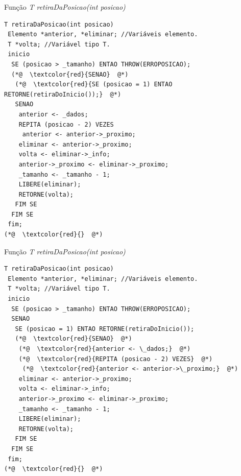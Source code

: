 \documentclass[12pt,table,xcolor={dvipsnames}]{beamer}
\begin{document}
\begin{frame}[fragile]{Função \textit{T retiraDaPosicao(int posicao)}}
\begin{lstlisting}
T retiraDaPosicao(int posicao)
 Elemento *anterior, *eliminar; //Variáveis elemento.
 T *volta; //Variável tipo T.
 inicio
  SE (posicao > _tamanho) ENTAO THROW(ERROPOSICAO);
  (*@  \textcolor{red}{SENAO}  @*)
   (*@  \textcolor{red}{SE (posicao = 1) ENTAO RETORNE(retiraDoInicio());}  @*)
   SENAO
    anterior <- _dados;
    REPITA (posicao - 2) VEZES
     anterior <- anterior->_proximo;
    eliminar <- anterior->_proximo;
    volta <- eliminar->_info;
    anterior->_proximo <- eliminar->_proximo;
    _tamanho <- _tamanho - 1;
    LIBERE(eliminar);
    RETORNE(volta);
   FIM SE
  FIM SE
 fim;
(*@  \textcolor{red}{}  @*)
\end{lstlisting}
\end{frame}

\begin{frame}[fragile]{Função \textit{T retiraDaPosicao(int posicao)}}
\begin{lstlisting}
T retiraDaPosicao(int posicao)
 Elemento *anterior, *eliminar; //Variáveis elemento.
 T *volta; //Variável tipo T.
 inicio
  SE (posicao > _tamanho) ENTAO THROW(ERROPOSICAO);
  SENAO
   SE (posicao = 1) ENTAO RETORNE(retiraDoInicio());
   (*@  \textcolor{red}{SENAO}  @*)
    (*@  \textcolor{red}{anterior <- \_dados;}  @*)
    (*@  \textcolor{red}{REPITA (posicao - 2) VEZES}  @*)
     (*@  \textcolor{red}{anterior <- anterior->\_proximo;}  @*)
    eliminar <- anterior->_proximo;
    volta <- eliminar->_info;
    anterior->_proximo <- eliminar->_proximo;
    _tamanho <- _tamanho - 1;
    LIBERE(eliminar);
    RETORNE(volta);
   FIM SE
  FIM SE
 fim;
(*@  \textcolor{red}{}  @*)
\end{lstlisting}
\end{frame}
\end{document}
